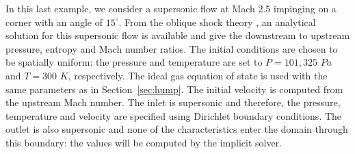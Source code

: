 \documentclass[preprint,10pt]{elsarticle}
\newcommand{\sct}[1]{Section~\ref{#1}}                   %
\begin{document}
In this last example, we consider a supersonic flow at Mach 2.5 impinging on a corner with an angle of $15^\circ$. From the oblique shock theory \cite{CompressionCorner}, an analytical solution for this supersonic flow is available and give the downstream to upstream pressure, entropy and Mach number ratios. 
The initial conditions are chosen to be spatially uniform: the pressure and temperature are set to $P=101,325$ $Pa$ and $T=300$ $K$, respectively.  The ideal gas equation of state is used with the same parameters as in \sct{sec:hump}. The initial velocity is computed from the upstream Mach number. The inlet is supersonic and therefore, the pressure, temperature and velocity are specified using Dirichlet boundary conditions. The outlet is also supersonic and none of the characteristics enter the domain through this boundary: the values will be computed by the implicit solver.
\end{document}
